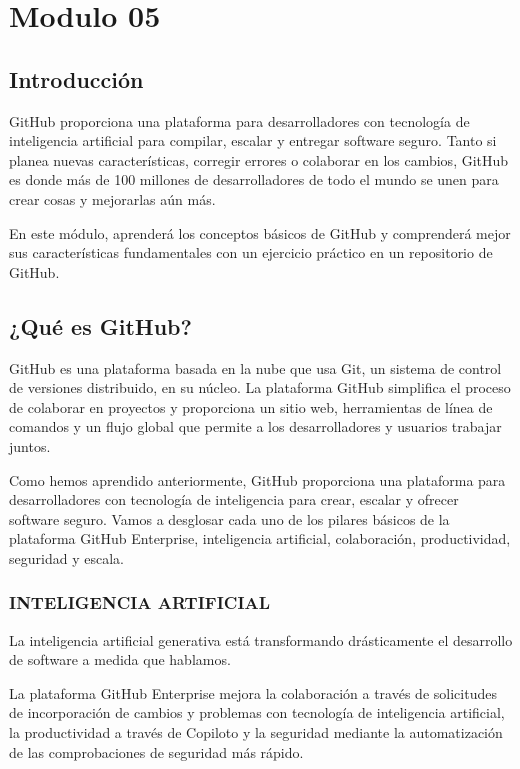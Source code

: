 \section{Modulo 05}


\subsection*{Introducción}

GitHub proporciona una plataforma para desarrolladores con tecnología de inteligencia artificial para compilar, escalar y entregar software seguro. Tanto si planea nuevas características, corregir errores o colaborar en los cambios, GitHub es donde más de 100 millones de desarrolladores de todo el mundo se unen para crear cosas y mejorarlas aún más.

En este módulo, aprenderá los conceptos básicos de GitHub y comprenderá mejor sus características fundamentales con un ejercicio práctico en un repositorio de GitHub.


\subsection*{¿Qué es GitHub?}

GitHub es una plataforma basada en la nube que usa Git, un sistema de control de versiones distribuido, en su núcleo. La plataforma GitHub simplifica el proceso de colaborar en proyectos y proporciona un sitio web, herramientas de línea de comandos y un flujo global que permite a los desarrolladores y usuarios trabajar juntos.

Como hemos aprendido anteriormente, GitHub proporciona una plataforma para desarrolladores con tecnología de inteligencia para crear, escalar y ofrecer software seguro. Vamos a desglosar cada uno de los pilares básicos de la plataforma GitHub Enterprise, inteligencia artificial, colaboración, productividad, seguridad y escala.

\subsubsection*{INTELIGENCIA ARTIFICIAL}

La inteligencia artificial generativa está transformando drásticamente el desarrollo de software a medida que hablamos.

La plataforma GitHub Enterprise mejora la colaboración a través de solicitudes de incorporación de cambios y problemas con tecnología de inteligencia artificial, la productividad a través de Copiloto y la seguridad mediante la automatización de las comprobaciones de seguridad más rápido.

